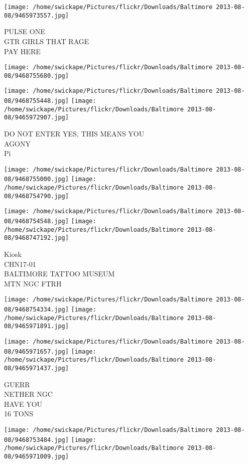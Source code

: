 \documentclass[10pt,letterpaper]{article}
\begin{document}
\texttt{[image: /home/swickape/Pictures/flickr/Downloads/Baltimore 2013-08-08/9465973557.jpg]}

PULSE ONE\\
GTR GIRLS THAT RAGE\\
PAY HERE
\pagebreak

\texttt{[image: /home/swickape/Pictures/flickr/Downloads/Baltimore 2013-08-08/9468755680.jpg]}

\vspace{0.25in}
\texttt{[image: /home/swickape/Pictures/flickr/Downloads/Baltimore 2013-08-08/9468755448.jpg]}
\texttt{[image: /home/swickape/Pictures/flickr/Downloads/Baltimore 2013-08-08/9465972907.jpg]}

DO NOT ENTER YES, THIS MEANS YOU\\
AGONY\\
Pi
\pagebreak

\texttt{[image: /home/swickape/Pictures/flickr/Downloads/Baltimore 2013-08-08/9468755000.jpg]}
\texttt{[image: /home/swickape/Pictures/flickr/Downloads/Baltimore 2013-08-08/9468754790.jpg]}

\texttt{[image: /home/swickape/Pictures/flickr/Downloads/Baltimore 2013-08-08/9468754548.jpg]}
\texttt{[image: /home/swickape/Pictures/flickr/Downloads/Baltimore 2013-08-08/9468747192.jpg]}

Kiosk\\
CHN17{-}01\\
BALTIMORE TATTOO MUSEUM\\
MTN NGC FTRH
\pagebreak

\texttt{[image: /home/swickape/Pictures/flickr/Downloads/Baltimore 2013-08-08/9468754334.jpg]}
\texttt{[image: /home/swickape/Pictures/flickr/Downloads/Baltimore 2013-08-08/9465971891.jpg]}

\texttt{[image: /home/swickape/Pictures/flickr/Downloads/Baltimore 2013-08-08/9465971657.jpg]}
\texttt{[image: /home/swickape/Pictures/flickr/Downloads/Baltimore 2013-08-08/9465971437.jpg]}

GUERR\\
NETHER NGC\\
HAVE YOU\\
16 TONS
\pagebreak

\texttt{[image: /home/swickape/Pictures/flickr/Downloads/Baltimore 2013-08-08/9468753484.jpg]}
\texttt{[image: /home/swickape/Pictures/flickr/Downloads/Baltimore 2013-08-08/9465971009.jpg]}
\end{document}
